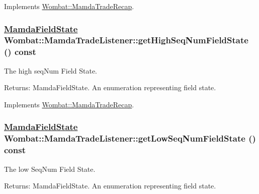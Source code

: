 Implements \hyperlink{classWombat_1_1MamdaTradeRecap_97b6fab4e918ee8397fe7586b9d710c2}{Wombat::Mamda\-Trade\-Recap}.\hypertarget{classWombat_1_1MamdaTradeListener_50fb169b697c0c3d26516b13f864db80}{
\subsubsection[getHighSeqNumFieldState]{\setlength{\rightskip}{0pt plus 5cm}\hyperlink{namespaceWombat_93aac974f2ab713554fd12a1fa3b7d2a}{Mamda\-Field\-State} Wombat::Mamda\-Trade\-Listener::get\-High\-Seq\-Num\-Field\-State () const}}
\label{classWombat_1_1MamdaTradeListener_50fb169b697c0c3d26516b13f864db80}


The high seq\-Num Field State. 

\begin{Desc}
\item[Returns:]Mamda\-Field\-State. An enumeration representing field state. \end{Desc}


Implements \hyperlink{classWombat_1_1MamdaTradeRecap_6553b87e01893b7740590f0b079ca87f}{Wombat::Mamda\-Trade\-Recap}.\hypertarget{classWombat_1_1MamdaTradeListener_61a7251329f3b6425a917dc2f95a8759}{
\subsubsection[getLowSeqNumFieldState]{\setlength{\rightskip}{0pt plus 5cm}\hyperlink{namespaceWombat_93aac974f2ab713554fd12a1fa3b7d2a}{Mamda\-Field\-State} Wombat::Mamda\-Trade\-Listener::get\-Low\-Seq\-Num\-Field\-State () const}}
\label{classWombat_1_1MamdaTradeListener_61a7251329f3b6425a917dc2f95a8759}


The low Seq\-Num Field State. 

\begin{Desc}
\item[Returns:]Mamda\-Field\-State. An enumeration representing field state. \end{Desc}


